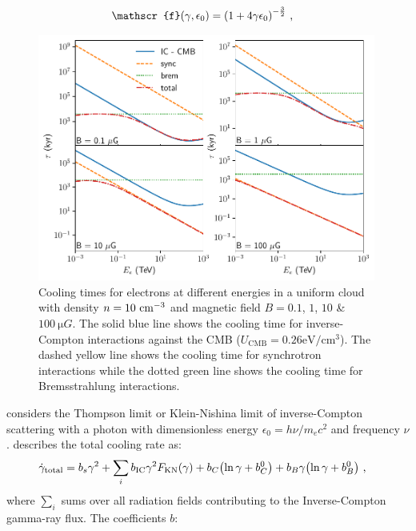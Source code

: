 \begin{equation}
    \begin{aligned}
    \mathscr{f}\qty(\gamma,\epsilon_0)&=\qty(1+4\gamma\epsilon_0)^{-\frac{3}{2}}\text{ ,}
    \end{aligned}
\end{equation}
\begin{figure}[h!]
		\includegraphics[width=0.99\textwidth]{04_Introduction/Images/non_thermal_emission/cooling_time_final.pdf}
		\caption{Cooling times for electrons at different energies in a uniform cloud with density $n=10~\si{\per\centi\meter\cubed}$ and magnetic field $B = 0.1$, $1$, $10$ \& $100~\si{\micro G}$. The solid blue line shows the cooling time for inverse-Compton interactions against the CMB ($U_\text{CMB}=0.26\si{\electronvolt\per\centi\meter\cubed}$). The dashed yellow line shows the cooling time for synchrotron interactions while the dotted green line shows the cooling time for Bremsstrahlung interactions.}
		\label{fig:chapter_1_non_thermal_emission_lep_cooling_losses}
\end{figure}
\noindent considers the Thompson limit or Klein-Nishina limit of inverse-Compton scattering with a photon with dimensionless energy $\epsilon_0=h\nu/m_ec^2$ and frequency $\nu$. \cite{2007A&A...474..689M} describes the total cooling rate as:
\begin{equation}
    \begin{aligned}
    \dot{\gamma}_\text{total}&=b_s\gamma^2+\sum_{i} b_\text{IC}\gamma^2F_\text{KN}\qty(\gamma)+b_C\qty(\ln \gamma+b_C^0)+b_B\gamma\qty(\ln\gamma+b_B^0) \text{ ,}
    \end{aligned} \label{eq:chapter_1_non_thermal_leptonic_cooling_rate}
\end{equation}
where $\sum_{i}$ sums over all radiation fields contributing to the Inverse-Compton gamma-ray flux. The coefficients $b$:

